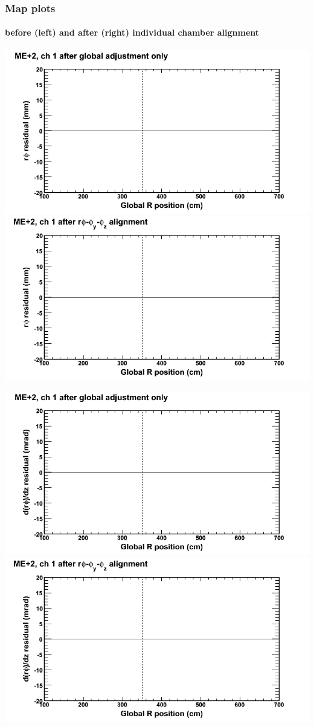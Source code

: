 \documentclass[compress]{beamer}
\begin{document}
\begin{frame}
\frametitle{Map plots}
\framesubtitle{before (left) and after (right) individual chamber alignment}
\includegraphics[width=0.5\linewidth]{ringmapplots_3dof/before_CSCvsr_mep2ch01_x.png} \includegraphics[width=0.5\linewidth]{ringmapplots_3dof/after_CSCvsr_mep2ch01_x.png}

\includegraphics[width=0.5\linewidth]{ringmapplots_3dof/before_CSCvsr_mep2ch01_dxdz.png} \includegraphics[width=0.5\linewidth]{ringmapplots_3dof/after_CSCvsr_mep2ch01_dxdz.png}
\end{frame}
\end{document}
